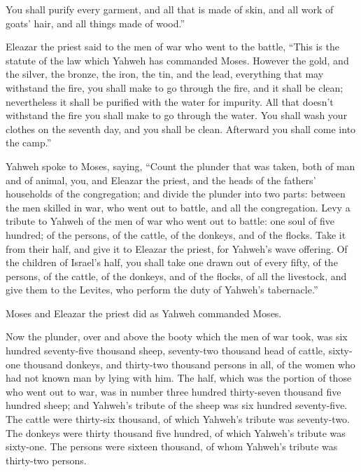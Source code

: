 {You shall purify every garment, and all that is made of skin, and all work of goats’ hair, and all things made of wood.”
\par }{\PP {}Eleazar the priest said to the men of war who went to the battle, “This is the statute of the law which Yahweh has commanded Moses.
However the gold, and the silver, the bronze, the iron, the tin, and the lead,
everything that may withstand the fire, you shall make to go through the fire, and it shall be clean; nevertheless it shall be purified with the water for impurity. All that doesn’t withstand the fire you shall make to go through the water.
You shall wash your clothes on the seventh day, and you shall be clean. Afterward you shall come into the camp.”
\par }{\PP {}Yahweh spoke to Moses, saying,
“Count the plunder that was taken, both of man and of animal, you, and Eleazar the priest, and the heads of the fathers’ households of the congregation;
and divide the plunder into two parts: between the men skilled in war, who went out to battle, and all the congregation.
Levy a tribute to Yahweh of the men of war who went out to battle: one soul of five hundred; of the persons, of the cattle, of the donkeys, and of the flocks.
Take it from their half, and give it to Eleazar the priest, for Yahweh’s wave offering.
Of the children of Israel’s half, you shall take one drawn out of every fifty, of the persons, of the cattle, of the donkeys, and of the flocks, of all the livestock, and give them to the Levites, who perform the duty of Yahweh’s tabernacle.”
\par }{\PP {}Moses and Eleazar the priest did as Yahweh commanded Moses.
\par }{\PP {}Now the plunder, over and above the booty which the men of war took, was six hundred seventy-five thousand sheep,
seventy-two thousand head of cattle,
sixty-one thousand donkeys,
and thirty-two thousand persons in all, of the women who had not known man by lying with him.
The half, which was the portion of those who went out to war, was in number three hundred thirty-seven thousand five hundred sheep;
and Yahweh’s tribute of the sheep was six hundred seventy-five.
The cattle were thirty-six thousand, of which Yahweh’s tribute was seventy-two.
The donkeys were thirty thousand five hundred, of which Yahweh’s tribute was sixty-one.
The persons were sixteen thousand, of whom Yahweh’s tribute was thirty-two persons.
}
